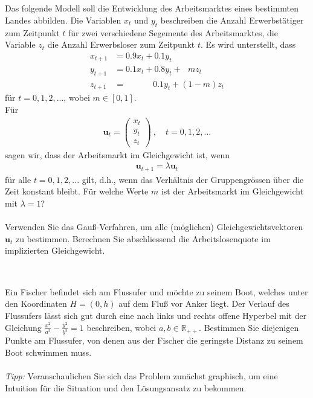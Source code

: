 \subsection*{}
Das folgende Modell soll die Entwicklung des Arbeitsmarktes eines bestimmten Landes abbilden.
Die Variablen $ x_t $ und $ y_t $ beschreiben die Anzahl Erwerbstätiger zum Zeitpunkt $ t $ für zwei verschiedene Segemente des Arbeitsmarktes, die Variable $ z_t $ die Anzahl Erwerbsloser zum Zeitpunkt $ t $.
Es wird unterstellt, dass
\begin{align*}
	x_{t+1} &= 0.9 x_t + 0.1 y_t\\
	y_{t+1} &= 0.1 x_t + 0.8 y_t + \ \ \  m z_t\\
	z_{t+1} &= \qquad \quad  \  0.1 y_t +(1-m) z_t 
\end{align*}
für $ t = 0,1,2,... $, wobei $ m \in [0,1] $.\\
Für 
\begin{align*}
	\textbf{u}_t = \begin{pmatrix}
		x_t \\ y_t \\ z_t
	\end{pmatrix} \ , \quad
	t = 0,1,2,...
\end{align*}
sagen wir, dass der Arbeitsmarkt im Gleichgewicht ist, wenn 
\begin{align*}
	\textbf{u}_{t+1} = \lambda \textbf{u}_t
\end{align*}
für alle $ t = 0,1,2,... $ gilt, d.h., wenn das Verhältnis der Gruppengrössen über die Zeit konstant bleibt. 
Für welche Werte $ m $ ist der Arbeitsmarkt im Gleichgewicht mit $ \lambda = 1 $?\\
\\
Verwenden Sie das Gauß-Verfahren, um alle (möglichen) Gleichgewichtsvektoren $ \textbf{u}_t $ zu bestimmen. Berechnen Sie abschliessend die Arbeitslosenquote im implizierten Gleichgewicht.
 \\
\\
\subsection*{}
Ein Fischer befindet sich am Flussufer und möchte zu seinem Boot, welches unter den Koordinaten $ H = (0,h) $ auf dem Fluß vor Anker liegt. Der Verlauf des Flussufers lässt sich gut durch eine nach links und rechts offene Hyperbel mit der Gleichung
$ \frac{x^2}{a^2} - \frac{y^2}{b^2} = 1 $ beschreiben, wobei $ a,b \in \mathbb{R}_{++} $.
Bestimmen Sie diejenigen Punkte am Flussufer, von denen aus der Fischer
die geringste Distanz zu seinem Boot schwimmen muss.\\
\\
\textit{Tipp:} Veranschaulichen Sie sich das Problem zunächst graphisch, um eine Intuition für die Situation und den Lösungsansatz zu bekommen.
\\ \\

